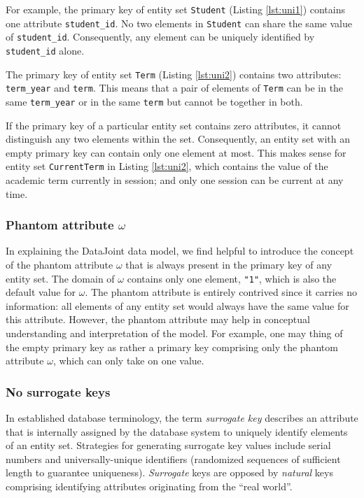 \documentclass[letter,10pt]{article}
\newcommand{\datajoint}{DataJoint\xspace}
\begin{document}
For example, the primary key of entity set \lstinline$Student$ (Listing \ref{lst:uni1}) contains one attribute \lstinline$student_id$.  
No two elements in \lstinline$Student$ can share the same value of \lstinline$student_id$. 
Consequently, any element can be uniquely identified by \lstinline$student_id$ alone. 

The primary key of entity set \lstinline$Term$ (Listing \ref{lst:uni2}) contains two attributes: \lstinline$term_year$ and \lstinline$term$.
This means that a pair of elements of \lstinline$Term$ can be in the same \lstinline$term_year$ or in the same \lstinline$term$ but cannot be together in both. 

If the primary key of a particular entity set contains zero attributes, it cannot distinguish any two elements within the set.  
Consequently, an entity set with an empty primary key can contain only one element at most.
This makes sense for entity set \lstinline$CurrentTerm$ in Listing \ref{lst:uni2}, which contains the value of the academic term currently in session; and only one session can be current at any time.

\subsubsection{Phantom attribute $\omega$}\label{sec:phantom}
In explaining the \datajoint data model, we find helpful to introduce the concept of the phantom attribute $\omega$ that is always present in the primary key of any entity set.  
The domain of $\omega$ contains only one element, \lstinline$"1"$, which is also the default value for $\omega$.
The phantom attribute is entirely contrived since it carries no information: all elements of any entity set would always have the same value for this attribute.
However, the phantom attribute may help in conceptual understanding and interpretation of the model.
For example, one may thing of the empty primary key as rather a primary key comprising only the phantom attribute $\omega$, which can only take on one value.
 
\subsubsection{No surrogate keys}
In established database terminology, the term \emph{surrogate key} describes an attribute that is internally assigned by the database system to uniquely identify elements of an entity set. 
Strategies for generating surrogate key values include serial numbers and universally-unique identifiers (randomized sequences of sufficient length to guarantee uniqueness).
\emph{Surrogate} keys are opposed by \emph{natural} keys comprising identifying attributes originating from the ``real world''.
\end{document}
